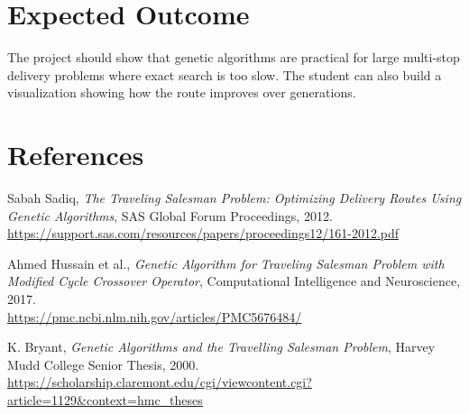 \documentclass[11pt,a4paper]{article}
\begin{document}
\section{Expected Outcome}

The project should show that genetic algorithms are practical for large multi-stop delivery problems where exact search is too slow. The student can also build a visualization showing how the route improves over generations.

\section*{References}

\begin{enumerate}[label={[\arabic*]},leftmargin=2.2em]
    \item Sabah Sadiq, \textit{The Traveling Salesman Problem: Optimizing Delivery Routes Using Genetic Algorithms}, SAS Global Forum Proceedings, 2012.\\
    \url{https://support.sas.com/resources/papers/proceedings12/161-2012.pdf}

    \item Ahmed Hussain et al., \textit{Genetic Algorithm for Traveling Salesman Problem with Modified Cycle Crossover Operator}, Computational Intelligence and Neuroscience, 2017.\\
    \url{https://pmc.ncbi.nlm.nih.gov/articles/PMC5676484/}

    \item K. Bryant, \textit{Genetic Algorithms and the Travelling Salesman Problem}, Harvey Mudd College Senior Thesis, 2000.\\
    \url{https://scholarship.claremont.edu/cgi/viewcontent.cgi?article=1129&context=hmc_theses}
\end{enumerate}
\end{document}
